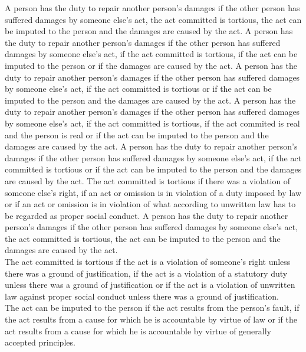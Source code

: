 \begin{exe}
\ex\label{e126} A person has the duty to repair another person's damages if the other person has suffered damages by someone else's act, the act committed is tortious, the act can be imputed to the person and the damages are caused by the act.
\ex\label{e127} A person has the duty to repair another person's damages if the other person has suffered damages by someone else's act, if the act committed is tortious, if the act can be imputed to the person or if the damages are caused by the act.
\ex\label{e128} A person has the duty to repair another person's damages if the other person has suffered damages by someone else's act, if the act committed is tortious or if the act can be imputed to the person and the damages are caused by the act.
\ex\label{e129} A person has the duty to repair another person's damages if the other person has suffered damages by someone else's act, if the act committed is tortious, if the act commited is real and the person is real or if the act can be imputed to the person and the damages are caused by the act.
\ex\label{e130} A person has the duty to repair another person's damages if the other person has suffered damages by someone else's act, if the act committed is tortious or if the act can be imputed to the person and the damages are caused by the act. The act committed is tortious if there was a violation of someone else’s right, if an act or omission is in violation of a duty imposed by law or if an act or omission is in violation of what according to unwritten law has to be regarded as proper social conduct.
\ex\label{e131} A person has the duty to repair another person's damages if the other person has suffered damages by someone else's act, the act committed is tortious, the act can be imputed to the person and the damages are caused by the act.\\ The act committed is tortious if the act is a violation of someone’s right unless there was a ground of justification, if the act is a violation of a statutory duty unless there was a ground of justification or if the act is a violation of unwritten law against proper social conduct unless there was a ground of justification.\\ The act can be imputed to the person if the act results from the person's fault, if the act results from a cause for which he is accountable by virtue of law or if the act results from a cause for which he is accountable by virtue of generally accepted principles.
\end{exe}

\clearpage